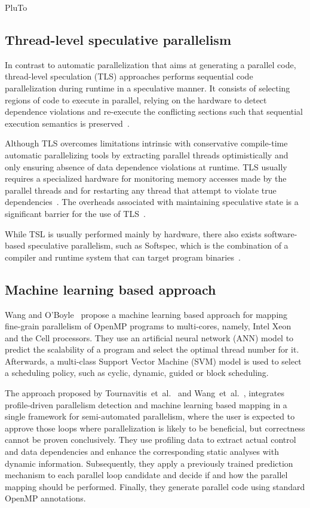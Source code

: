\documentclass[a4paper,12pt]{article}
\newcommand{\etal}{et~al.}
\begin{document}
PluTo~\cite{bondhugula08}

\subsection{Thread-level speculative parallelism}

In contrast to automatic parallelization that aims at generating a parallel
code, thread-level speculation (TLS) approaches performs sequential code
parallelization during runtime in a speculative manner.  It consists of
selecting regions of code to execute in parallel, relying on the hardware to
detect dependence violations and re-execute the conflicting sections such that
sequential execution semantics is preserved~\cite{hammond98,chen03,wu08}.

Although TLS overcomes limitations intrinsic with conservative compile-time
automatic parallelizing tools by extracting parallel threads optimistically and
only ensuring absence of data dependence violations at runtime.  TLS usually
requires a specialized hardware for monitoring memory accesses made by the
parallel threads and for restarting any thread that attempt to violate true
dependencies~\cite{krishnan98,hammond98,wu08}.  The overheads associated with
maintaining speculative state is a significant barrier for the use of
TLS~\cite{yiapanis13}.

While TSL is usually performed mainly by hardware, there also exists
software-based speculative parallelism, such as Softspec, which is the
combination of a compiler and runtime system that can target program
binaries~\cite{bruening98}.

\subsection{Machine learning based approach}

Wang and O'Boyle~\cite{wang09} propose a machine learning based approach for
mapping fine-grain parallelism of OpenMP programs to multi-cores, namely, Intel
Xeon and the Cell processors.  They use an artificial neural network (ANN)
model to predict the scalability of a program and select the optimal thread
number for it.  Afterwards, a multi-class Support Vector Machine (SVM) model is
used to select a scheduling policy, such as cyclic, dynamic, guided or block
scheduling.

The approach proposed by Tournavitis~\etal~\cite{tournavitis09} and
Wang~\etal~\cite{wang14a}, integrates profile-driven parallelism detection and
machine learning based mapping in a single framework for semi-automated
parallelism, where the user is expected to approve those loops where
parallelization is likely to be beneficial, but correctness cannot be proven
conclusively.  They use profiling data to extract actual control and data
dependencies and enhance the corresponding static analyses with dynamic
information. Subsequently, they apply a previously trained prediction mechanism
to each parallel loop candidate and decide if and how the parallel mapping
should be performed. Finally, they generate parallel code using standard OpenMP
annotations.
\end{document}
